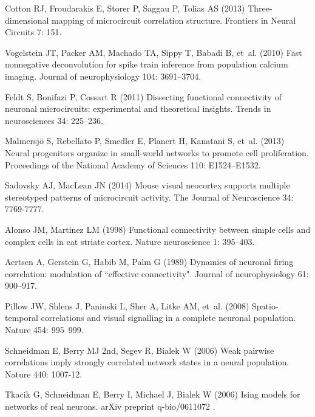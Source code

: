 \begin{thebibliography}{100}
Cotton RJ, Froudarakis E, Storer P, Saggau P, Tolias AS (2013)
  Three-dimensional mapping of microcircuit correlation structure.
\newblock Frontiers in Neural Circuits 7: 151.

Vogelstein JT, Packer AM, Machado TA, Sippy T, Babadi B, et~al. (2010) Fast
  nonnegative deconvolution for spike train inference from population calcium
  imaging.
\newblock Journal of neurophysiology 104: 3691--3704.

Feldt S, Bonifazi P, Cossart R (2011) Dissecting functional connectivity of
  neuronal microcircuits: experimental and theoretical insights.
\newblock Trends in neurosciences 34: 225--236.

Malmersj{\"o} S, Rebellato P, Smedler E, Planert H, Kanatani S, et~al. (2013)
  Neural progenitors organize in small-world networks to promote cell
  proliferation.
\newblock Proceedings of the National Academy of Sciences 110: E1524--E1532.

Sadovsky AJ, MacLean JN (2014) Mouse visual neocortex supports multiple
  stereotyped patterns of microcircuit activity.
\newblock The Journal of Neuroscience 34: 7769-7777.

Alonso JM, Martinez LM (1998) Functional connectivity between simple cells and
  complex cells in cat striate cortex.
\newblock Nature neuroscience 1: 395--403.

Aertsen A, Gerstein G, Habib M, Palm G (1989) Dynamics of neuronal firing
  correlation: modulation of ``effective connectivity".
\newblock Journal of neurophysiology 61: 900--917.

Pillow JW, Shlens J, Paninski L, Sher A, Litke AM, et~al. (2008)
  Spatio-temporal correlations and visual signalling in a complete neuronal
  population.
\newblock Nature 454: 995--999.

Schneidman E, Berry MJ 2nd, Segev R, Bialek W (2006) Weak pairwise correlations
  imply strongly correlated network states in a neural population.
\newblock Nature 440: 1007-12.

Tkacik G, Schneidman E, Berry I, Michael J, Bialek W (2006) Ising models for
  networks of real neurons.
\newblock arXiv preprint q-bio/0611072 .


\end{thebibliography}

